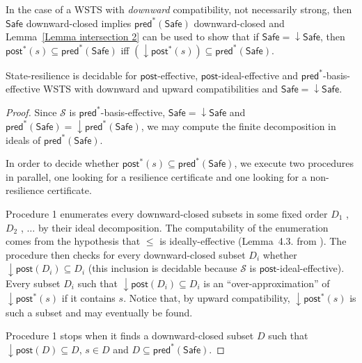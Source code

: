 \documentclass[runningheads]{llncs}
\newcommand{\alain}[1]{\todo[inline,color=red!20]{{\bf AF:} #1}}
\newcommand{\mathieu}[1]{\todo[inline,color=blue!20]{{\bf MH:} #1}}
\newcommand{\pred}{\textsf{pred}}
\newcommand{\post}{\textsf{post}}
\newcommand{\Safe}{\textsf{Safe}}
\begin{document}
In the case of a WSTS with \emph{downward} compatibility, not necessarily strong,
then $\Safe$ downward-closed implies $\pred^*(\Safe)$ downward-closed and
Lemma~\ref{Lemma intersection 2} can be used to show that
if $\Safe = \mathop{\downarrow} \Safe$,
then
$\post^*(s)  
\subseteq \pred^*(\Safe)$  iff $ (\mathop{\downarrow}  \post^*(s)) 
\subseteq \pred^*(\Safe)$.


\begin{theorem}\label{downward srp}
{\sc State-resilience} is decidable for $\post$-effective, 
$\post$-ideal-effective and $\pred^*$-basis-effective WSTS with downward and upward compatibilities
and $\Safe = \mathop{\downarrow} \Safe$.
\end{theorem}

\begin{proof}
Since $\mathscr{S}$ is $\pred^*$-basis-effective, $\Safe = \mathop{\downarrow} \Safe$ and $\pred^*(\Safe)=\mathop{\downarrow} \pred^*(\Safe)$, we may compute the finite decomposition in ideals of $\pred^*(\Safe)$.

In order to decide whether %
$\post^{ *}(s)  
 \subseteq \pred^*(\Safe)$, we execute two procedures in parallel,
one looking for a resilience certificate and one looking for a non-resilience certificate.

Procedure 1 enumerates every downward-closed subsets in some fixed order $D_1$ , $D_2$ , $\ldots$ by their ideal decomposition. The computability of the enumeration comes from the hypothesis that $\leq$ is ideally-effective (Lemma~4.3. from \cite{DBLP:journals/lmcs/BlondinFM17}).
The procedure then checks for every downward-closed subset $D_i$ whether $\mathop{\downarrow} \post(D_i) \subseteq D_i$ (this inclusion is decidable because $\mathscr{S}$ is $\post$-ideal-effective). 
Every subset $D_i$ such that $\mathop{\downarrow} \post(D_i) \subseteq D_i$ is an “over-approximation” of $\mathop{\downarrow} \post^*(s)$ if it contains $s$.
Notice that, by 
upward compatibility, $\mathop{\downarrow} \post^*(s)$ is such a subset and may eventually be found.

Procedure 1 stops when it finds a downward-closed subset $D$ such that
$\mathop{\downarrow} \post(D) \subseteq D$,
$s \in D$ and
$D   \subseteq \pred^*(\Safe)$. 


\end{proof}
\end{document}
